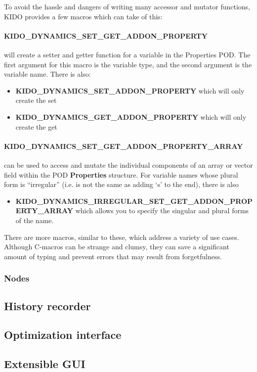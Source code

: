 To avoid the hassle and dangers of writing many accessor and mutator functions, KIDO provides a few macros which can take of this:

\paragraph{KIDO\_DYNAMICS\_SET\_GET\_ADDON\_PROPERTY} will create a setter and getter function for a variable in the Properties POD. The first argument for this macro is the variable type, and the second argument is the variable name. There is also:
\begin{itemize}
  \item \textbf{KIDO\_DYNAMICS\_SET\_ADDON\_PROPERTY} which will only create the set
  \item \textbf{KIDO\_DYNAMICS\_GET\_ADDON\_PROPERTY} which will only create the get
\end{itemize} 

\paragraph{KIDO\_DYNAMICS\_SET\_GET\_ADDON\_PROPERTY\_ARRAY} can be used to access and mutate the individual components of an array or vector field within the POD \textbf{Properties} structure. For variable names whose plural form is ``irregular'' (i.e. is not the same as adding `s' to the end), there is also 

\begin{itemize}
  \item \textbf{KIDO\_DYNAMICS\_IRREGULAR\_SET\_GET\_ADDON\_PROPERTY\_ARRAY} which allows you to specify the singular and plural forms of the name.
\end{itemize}

There are more macros, similar to these, which address a variety of use cases. Although C-macros can be strange and clumsy, they can save a significant amount of typing and prevent errors that may result from forgetfulness.

\subsubsection{Nodes}
\label{sec:nodes}
\subsection{History recorder}
\subsection{Optimization interface}
\label{sec:optimizer}
\subsection{Extensible GUI}

